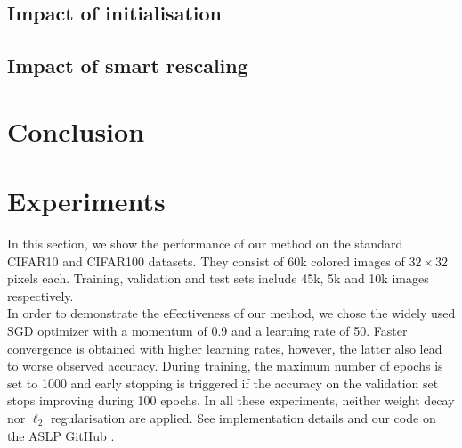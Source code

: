 
\subsection{Impact of initialisation}

\subsection{Impact of smart rescaling}



\section{Conclusion}

\newpage
\newpage


  \section{Experiments}\label{sec:experiments}
  
  In this section, we show the performance of our method on the standard CIFAR10
  and CIFAR100 datasets.   They consist of  60k  colored images of $32\times 32$
  pixels each.  Training,  validation and test sets  include  45k,  5k and 10k
  images respectively.  \\  In order to demonstrate the effectiveness of our
  method, we chose the widely used SGD optimizer with a momentum of  0.9  and a
  learning rate of 50.    Faster convergence is obtained with higher learning
  rates,   however,  the latter also lead  to worse observed accuracy.   During
  training,  the maximum number of epochs is set to 1000 and early stopping is
  triggered  if the accuracy on the validation set stops improving during 100
  epochs.   In all these experiments, neither weight decay nor $\ell_2$
  regularisation are applied. See implementation details and our code on the ASLP GitHub
  \cite{Dupont2022}.

